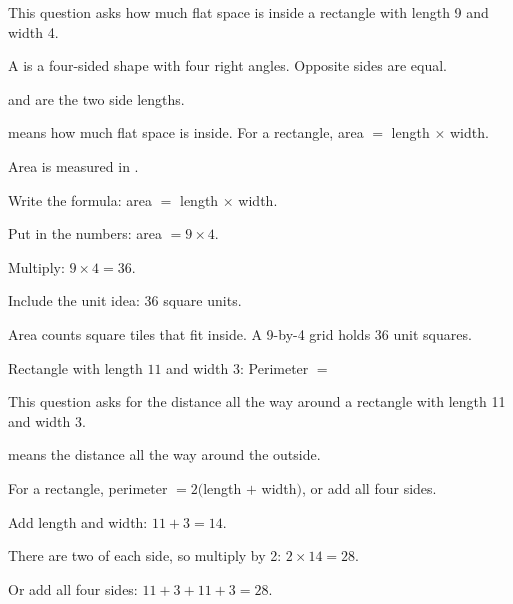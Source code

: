 This question asks how much flat space is inside a rectangle with length 9 and
width 4.

\begin{words}
  \item A is a four-sided shape with four right angles. Opposite
        sides are equal.
  \item {}and are the two side lengths.
  \item {}means how much flat space is inside. For a rectangle,
        area $=$ length $\times$ width.
  \item Area is measured in .
\end{words}

\begin{steps}
  \item Write the formula: area $=$ length $\times$ width.
  \item Put in the numbers: area $= 9 \times 4$.
  \item Multiply: $9 \times 4 = 36$.
  \item Include the unit idea: 36 square units.
\end{steps}


Area counts square tiles that fit inside. A 9-by-4 grid holds 36 unit squares.


Rectangle with length $11$ and width $3$: Perimeter $= $\ansblank


This question asks for the distance all the way around a rectangle with length
11 and width 3.

\begin{words}
  \item {}means the distance all the way around the outside.
  \item For a rectangle, perimeter $= 2($length $+$ width$)$, or add all four
        sides.
\end{words}

\begin{steps}
  \item Add length and width: $11 + 3 = 14$.
  \item There are two of each side, so multiply by 2: $2 \times 14 = 28$.
  \item Or add all four sides: $11 + 3 + 11 + 3 = 28$.
\end{steps}

